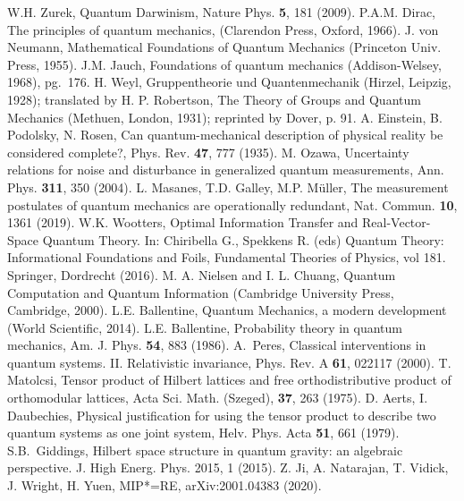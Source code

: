 \documentclass[aps,prl,amsmath,amssymb,twocolumn,nofootinbib]{revtex4}
\theoremstyle{plain}
\theoremstyle{definition}
\theoremstyle{remark}
\begin{document}
\begin{references}
 W.H. Zurek, Quantum Darwinism, Nature Phys. {\bf 5},
  181 (2009).
P.A.M. Dirac, The principles of quantum mechanics,
  (Clarendon Press, Oxford, 1966).
J. von Neumann, Mathematical Foundations of
  Quantum Mechanics (Princeton Univ.  Press, 1955).
J.M. Jauch, Foundations of quantum mechanics
  (Addison-Welsey, 1968), pg.~176.
 H. Weyl, Gruppentheorie und Quantenmechanik (Hirzel,
  Leipzig, 1928); translated by H. P. Robertson, The Theory of Groups
  and Quantum Mechanics (Methuen, London, 1931); reprinted by Dover,
  p. 91.
A. Einstein, B. Podolsky, N. Rosen, Can
  quantum-mechanical description of physical reality be considered
  complete?, Phys. Rev. {\bf 47}, 777 (1935).
M. Ozawa, {Uncertainty relations for noise and
    disturbance in generalized quantum measurements}, Ann. Phys.  {\bf
    311}, 350 (2004).
L. Masanes, T.D. Galley, M.P. M\" uller, The
  measurement postulates of quantum mechanics are operationally
  redundant, Nat. Commun. {\bf 10}, 1361 (2019).
W.K. Wootters, Optimal Information Transfer and
  Real-Vector-Space Quantum Theory. In: Chiribella G., Spekkens R.
  (eds) Quantum Theory: Informational Foundations and Foils,
  Fundamental Theories of Physics, vol 181. Springer, Dordrecht
  (2016).
M. A. Nielsen and I. L. Chuang, Quantum Computation
  and Quantum Information (Cambridge University Press, Cambridge,
  2000).
L.E. Ballentine, Quantum Mechanics, a modern
  development (World Scientific, 2014).
L.E. Ballentine, Probability theory in
  quantum mechanics, Am. J. Phys. {\bf 54}, 883 (1986).
A.~Peres, Classical interventions in quantum systems.
  II. Relativistic invariance, Phys. Rev. A {\bf 61}, 022117 (2000).
 T. Matolcsi, Tensor product of Hilbert lattices and
  free orthodistributive product of orthomodular lattices, Acta Sci.
  Math. (Szeged), {\bf 37}, 263 (1975).
 D. Aerts, I. Daubechies, Physical justification for
  using the tensor product to describe two quantum systems as one
  joint system, Helv. Phys. Acta {\bf 51}, 661 (1979).
S.B.~Giddings, Hilbert space structure in quantum
  gravity: an algebraic perspective. J. High Energ. Phys. 2015, 1
  (2015).%
Z. Ji, A. Natarajan, T. Vidick, J. Wright, H. Yuen, MIP*=RE, arXiv:2001.04383 (2020). %

\end{references}
\end{document}
